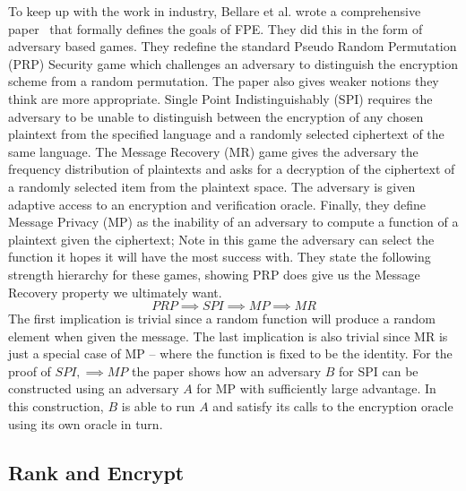 \documentclass[ %
                    author={Samuel Russell},
                supervisor={Prof. Bogdan Warinschi},
                    degree={MEng},
                     title={Innocuous Ciphertexts},
                  subtitle={The DE-CENSOR Scheme},
                      type={research},
                      year={2018} ]{dissertation}
\begin{document}
To keep up with the work in industry, Bellare et al. wrote a comprehensive paper~\cite{fpe} that formally defines the goals of FPE. They did this in the form of adversary based games. They redefine the standard Pseudo Random Permutation (PRP) Security game which challenges an adversary to distinguish the encryption scheme from a random permutation. The paper also gives weaker notions they think are more appropriate. Single Point Indistinguishably (SPI) requires the adversary to be unable to distinguish between the encryption of any chosen plaintext from the specified language and a randomly selected ciphertext of the same language. The Message Recovery (MR) game gives the adversary the frequency distribution of plaintexts and asks for a decryption of the ciphertext of a randomly selected item from the plaintext space. The adversary is given adaptive access to an encryption and verification oracle. Finally, they define Message Privacy (MP) as the inability of an adversary to compute a function of a plaintext given the ciphertext; Note in this game the adversary can select the function it hopes it will have the most success with. They state the following strength hierarchy for these games, showing PRP does give us the Message Recovery property we ultimately want.
$$ PRP \implies SPI \implies MP \implies MR $$
The first implication is trivial since a random function will produce a random element when given the message. The last implication is also trivial since MR is just a special case of MP -- where the function is fixed to be the identity. For the proof of $ SPI, \implies MP $ the paper shows how an adversary $B$ for SPI can be constructed using an adversary $A$ for MP with sufficiently large advantage. In this construction, $B$ is able to run $A$ and satisfy its calls to the encryption oracle using its own oracle in turn.

\subsection{Rank and Encrypt}
\end{document}
